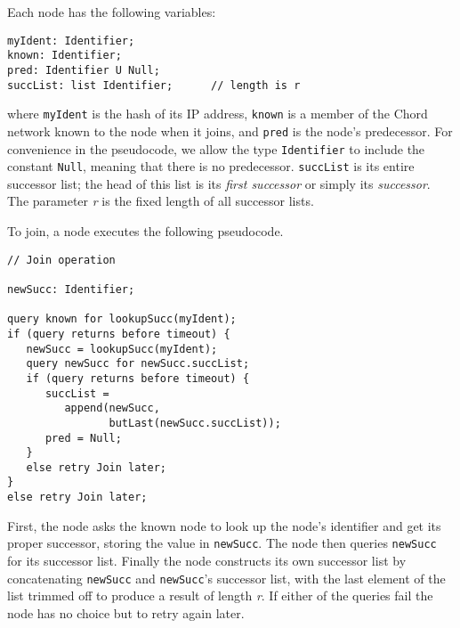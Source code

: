 \documentclass[conference]{IEEEtran}
\begin{document}
Each node has the following variables:
\small
\begin{verbatim}
myIdent: Identifier;
known: Identifier;
pred: Identifier U Null;
succList: list Identifier;      // length is r
\end{verbatim}
\normalsize
where
\small
{\tt myIdent}
\normalsize
is the hash of its IP address,
\small
{\tt known}
\normalsize
is a member of the Chord network known to the node
when it joins, and
\small
{\tt pred}
\normalsize
is the node's predecessor.
For convenience in the pseudocode, we allow the type
\small
{\tt Identifier}
\normalsize
to include the constant
\small
{\tt Null},
\normalsize
meaning that there is no predecessor.
\small
{\tt succList}
\normalsize
is its entire successor list; the head of this list
is its {\it first successor} or simply its {\it successor}.
The parameter {\it r} is the fixed length of all successor lists.

To join, a node executes the following pseudocode.
\small
\begin{verbatim}
// Join operation

newSucc: Identifier;

query known for lookupSucc(myIdent);
if (query returns before timeout) {
   newSucc = lookupSucc(myIdent);
   query newSucc for newSucc.succList;
   if (query returns before timeout) {
      succList =
         append(newSucc,
                butLast(newSucc.succList));
      pred = Null;
   }
   else retry Join later;
}
else retry Join later;
\end{verbatim}
\normalsize
First, the node asks the known node to look up the node's identifier and
get its proper successor, storing the value in
\small
{\tt newSucc}.
\normalsize
The node then queries
\small
{\tt newSucc}
\normalsize
for its successor list.
Finally the node constructs its own successor list by
concatenating
\small
{\tt newSucc}
\normalsize
and
\small
{\tt newSucc}'s
\normalsize
successor list, with the
last element of the list trimmed off to produce a
result of length {\it r}.
If either of the queries fail the node has no choice but to retry
again later.
\end{document}
